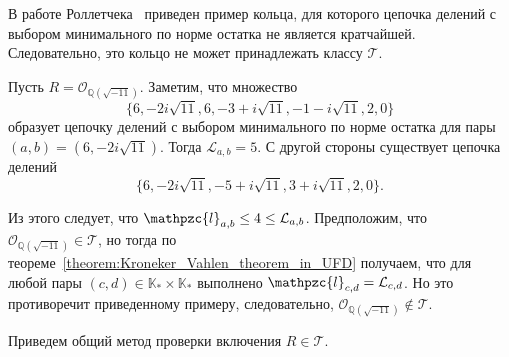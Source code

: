 \documentclass[_00_dissertation.tex]{subfiles}
\begin{document}
В работе Роллетчека~\cite[с.~341]{source:Rolletschek_1990} приведен пример кольца, для которого цепочка делений с выбором минимального по норме остатка не является кратчайшей.
Следовательно, это кольцо не может принадлежать классу $\mathcal{T}$.

\begin{example}\label{example:Z[sqrt{-11}]} \cite[с.~341]{source:Rolletschek_1990}
    Пусть $R = \mathcal{O}_{\mathbb{Q}(\sqrt{-11})}$.
    Заметим, что множество
    \begin{equation*}
        \{
            6, -2i\sqrt{11}, 6, -3 + i\sqrt{11}, -1 - i\sqrt{11}, 2, 0
        \}
    \end{equation*}
    образует цепочку делений с выбором минимального по норме остатка для пары $(a, b) = (6, -2i\sqrt{11})$.
    Тогда $\mathcal{L}_{a,b} = 5$.
    С другой стороны существует цепочка делений
    \begin{equation*}
        \{
            6, -2i\sqrt{11}, -5 + i\sqrt{11}, 3 + i\sqrt{11}, 2, 0
        \}.
    \end{equation*}
    
    Из этого следует, что $\mathpzc{l}_{a,b}\le 4\le \mathcal{L}_{a,b}$.
    Предположим, что $\mathcal{O}_{\mathbb{Q}(\sqrt{-11})} \in \mathcal{T}$, но тогда по теореме~\ref{theorem:Kroneker_Vahlen_theorem_in_UFD} получаем, что для любой пары $(c,d)\in\mathbb{K}_* \times\mathbb{K}_*$ выполнено $\mathpzc{l}_{c,d} = \mathcal{L}_{c,d}$.
    Но это противоречит приведенному примеру, следовательно, $\mathcal{O}_{\mathbb{Q}(\sqrt{-11})} \not\in \mathcal{T}$.
\end{example}


Приведем общий метод проверки включения $R \in \mathcal{T}$.
\end{document}

